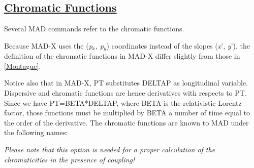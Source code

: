 \subsection{\href{chrom}{Chromatic Functions}} 
\label{subsec:tables_chrom}
Several MAD commands refer to the chromatic functions. 

Because MAD-X uses the (\textit{p$_x$}, \textit{p$_y$}) coordinates
instead of the slopes (\textit{x}', \textit{y}'), the definition of the
chromatic functions in MAD-X differ slightly from those in
\href{bibliography.html#montague}{[Montague]}.  

Notice also that in MAD-X, PT substitutes DELTAP as longitudinal
variable. Dispersive and chromatic functions are hence derivatives with
respects to PT. Since we have PT=BETA*DELTAP, where BETA is the
relativistic Lorentz factor, those functions must be multiplied by BETA
a number of time equal to the order of the derivative. The chromatic
functions are known to MAD under the following names:  

\textit{Please note that this option is needed for a proper calculation
  of the chromaticities in the presence of coupling!} 

